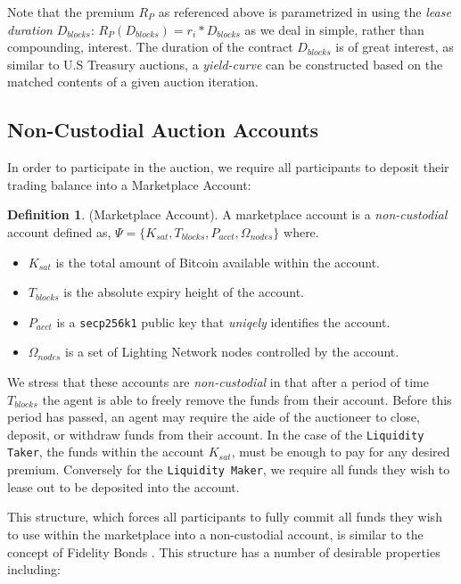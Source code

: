 \documentclass[10pt,a4paper]{article}
\theoremstyle{definition}
\newtheorem{definition}{Definition}[section]
\begin{document}
Note that the premium $R_{P}$ as referenced above is parametrized in using the
\emph{lease duration} $D_{blocks}$: $R_{P}(D_{blocks}) = r_i * D_{blocks}$ as
we deal in simple, rather than compounding, interest.  The duration of the
contract $D_{blocks}$ is of great interest, as similar to U.S Treasury
auctions, a \emph{yield-curve} can be constructed based on the matched
contents of a given auction iteration.


\subsection{Non-Custodial Auction Accounts}

In order to participate in the auction, we require all participants to deposit their
trading balance into a Marketplace Account:

\theoremstyle{definition}
\begin{definition}{(Marketplace Account).}
A marketplace account is a \emph{non-custodial} account defined as, $\Psi =
\{K_{sat}, T_{blocks}, P_{acct}, \Omega_{nodes} \}$ where.
\end{definition}

\begin{itemize}
    \item $K_{sat}$ is the total amount of Bitcoin available within the account.
    \item $T_{blocks}$ is the absolute expiry height of the account.
    \item $P_{acct}$ is a \texttt{secp256k1} public key  that \emph{uniqely} identifies the account.
    \item $\Omega_{nodes}$ is a set of Lighting Network nodes controlled by the account.
\end{itemize}

We stress that these accounts are \emph{non-custodial} in that after a period
of time $T_{blocks}$ the agent is able to freely remove the funds from their
account. Before this period has passed, an agent may require the aide of the
auctioneer to close, deposit, or withdraw funds from their account. In the case
of the \texttt{Liquidity Taker}, the funds within the account $K_{sat}$, must
be enough to pay for any desired premium. Conversely for the \texttt{Liquidity
Maker}, we require all funds they wish to lease out to be deposited into the
account.

This structure, which forces all participants to fully commit all funds they
wish to use within the marketplace into a non-custodial account, is similar to
the concept of Fidelity Bonds \cite{fidelityBonds}. This structure has a number
of desirable properties including:
\end{document}
